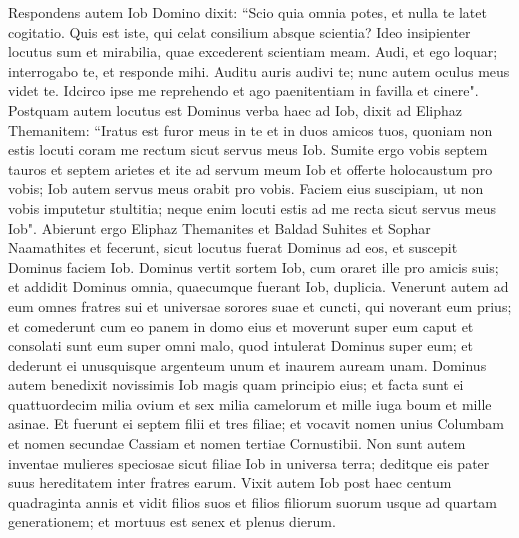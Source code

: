 \begin{biblechapter}  
\verse Respondens autem Iob Domino dixit: 
\verse “Scio quia omnia potes, et nulla te latet cogitatio. 
\verse Quis est iste, qui celat consilium absque scientia? Ideo insipienter locutus sum et mirabilia, quae excederent scientiam meam. 
\verse Audi, et ego loquar; interrogabo te, et responde mihi. 
\verse Auditu auris audivi te; nunc autem oculus meus videt te. 
\verse Idcirco ipse me reprehendo et ago paenitentiam in favilla et cinere". 
\verse Postquam autem locutus est Dominus verba haec ad Iob, dixit ad Eliphaz Themanitem: “Iratus est furor meus in te et in duos amicos tuos, quoniam non estis locuti coram me rectum sicut servus meus Iob. 
\verse Sumite ergo vobis septem tauros et septem arietes et ite ad servum meum Iob et offerte holocaustum pro vobis; Iob autem servus meus orabit pro vobis. Faciem eius suscipiam, ut non vobis imputetur stultitia; neque enim locuti estis ad me recta sicut servus meus Iob". 
\verse Abierunt ergo Eliphaz Themanites et Baldad Suhites et Sophar Naamathites et fecerunt, sicut locutus fuerat Dominus ad eos, et suscepit Dominus faciem Iob. 
\verse Dominus vertit sortem Iob, cum oraret ille pro amicis suis; et addidit Dominus omnia, quaecumque fuerant Iob, duplicia. 
\verse Venerunt autem ad eum omnes fratres sui et universae sorores suae et cuncti, qui noverant eum prius; et comederunt cum eo panem in domo eius et moverunt super eum caput et consolati sunt eum super omni malo, quod intulerat Dominus super eum; et dederunt ei unusquisque argenteum unum et inaurem auream unam. 
\verse Dominus autem benedixit novissimis Iob magis quam principio eius; et facta sunt ei quattuordecim milia ovium et sex milia camelorum et mille iuga boum et mille asinae. 
\verse Et fuerunt ei septem filii et tres filiae; 
\verse et vocavit nomen unius Columbam et nomen secundae Cassiam et nomen tertiae Cornustibii. 
\verse Non sunt autem inventae mulieres speciosae sicut filiae Iob in universa terra; deditque eis pater suus hereditatem inter fratres earum.  
\verse Vixit autem Iob post haec centum quadraginta annis et vidit filios suos et filios filiorum suorum usque ad quartam generationem; et mortuus est senex et plenus dierum.
\end{biblechapter}

